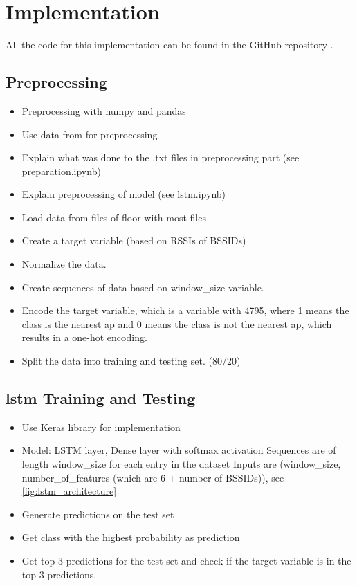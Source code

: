 \chapter{Implementation}\label{sec:implementation}

All the code for this implementation can be found in the GitHub repository \cite{github-repo}.

\section{Preprocessing}
\begin{itemize}
    \item Preprocessing with numpy and pandas
    \item Use data from  for preprocessing
    \item Explain what was done to the .txt files in preprocessing part  (see \cite{github-repo} preparation.ipynb)
    \item Explain preprocessing of model (see \cite{github-repo} lstm.ipynb)
    \item Load data from files of floor with most files
    \item Create a target variable (based on RSSIs of BSSIDs)
    \item Normalize the data.
    \item Create sequences of data based on window\_size variable.
    \item Encode the target variable, which is a variable with 4795, where 1 means the class is the nearest \ac{ap} and 0 means the class is not the nearest \ac{ap}, which results in a one-hot encoding.
    \item Split the data into training and testing set. (80/20)
\end{itemize}

%     

\section{\ac{lstm} Training and Testing}
\begin{itemize}
    \item Use Keras library for implementation \cite{keras}
    \item Model: LSTM layer, Dense layer with softmax activation
    \subitem Sequences are of length window\_size for each entry in the dataset
    \subitem Inputs are (window\_size, number\_of\_features (which are 6 + number of BSSIDs)), see \cref{fig:lstm_architecture}
    \item Generate predictions on the test set
    \item Get class with the highest probability as prediction
    \item Get top 3 predictions for the test set and check if the target variable is in the top 3 predictions.
\end{itemize}

